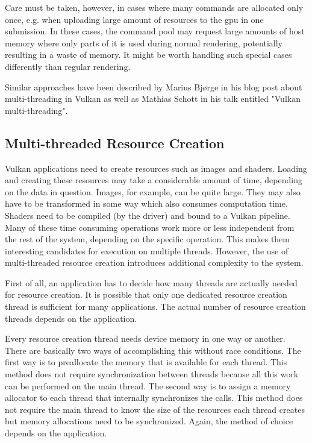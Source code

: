         Care must be taken, however, in cases where many commands are allocated only once, e.g. when uploading large amount of resources to the \gls{gpu} in one submission.
        In these cases, the command pool may request large amounts of host memory where only parts of it is used during normal rendering, potentially resulting in a waste of memory.
        It might be worth handling such special cases differently than regular rendering.

        Similar approaches have been described by Marius Bjørge\cite{bjorge:multithreadingvulkan} in his blog post about multi-threading in Vulkan as well as Mathias Schott\cite{mschott:vulkan_multi_threading} in his talk entitled "Vulkan multi-threading".

    \subsection{Multi-threaded Resource Creation}
      Vulkan applications need to create resources such as images and shaders.
      Loading and creating these resources may take a considerable amount of time, depending on the data in question.
      Images, for example, can be quite large.
      They may also have to be transformed in some way which also consumes computation time.
      Shaders need to be compiled (by the \gls{driver}) and bound to a Vulkan pipeline.
      Many of these time consuming operations work more or less independent from the rest of the system, depending on the specific operation.
      This makes them interesting candidates for execution on multiple threads.
      However, the use of multi-threaded resource creation introduces additional complexity to the system.

      First of all, an application has to decide how many threads are actually needed for resource creation.
      It is possible that only one dedicated resource creation thread is sufficient for many applications.
      The actual number of resource creation threads depends on the application.

      Every resource creation thread needs device memory in one way or another.
      There are basically two ways of accomplishing this without race conditions.
      The first way is to preallocate the memory that is available for each thread.
      This method does not require synchronization between threads because all this work can be performed on the main thread.
      The second way is to assign a memory allocator to each thread that internally synchronizes the calls.
      This method does not require the main thread to know the size of the resources each thread creates but memory allocations need to be synchronized.
      Again, the method of choice depends on the application.
